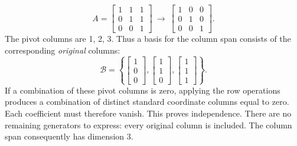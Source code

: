 \[A=\left[\begin{array}{rrr}1&1&1\\0&1&1\\0&0&1\end{array}\right]\ \longrightarrow\ \left[\begin{array}{rrr}1&0&0\\0&1&0\\0&0&1\end{array}\right].\]
The pivot columns are 1, 2, 3. Thus a basis for the column span consists of the corresponding \emph{original} columns:
\[\mathcal B=\left\{\left[\begin{array}{r}1\\0\\0\end{array}\right],\left[\begin{array}{r}1\\1\\0\end{array}\right],\left[\begin{array}{r}1\\1\\1\end{array}\right]\right\}.\]
If a combination of these pivot columns is zero, applying the row operations produces a combination of distinct standard coordinate columns equal to zero. Each coefficient must therefore vanish. This proves independence. There are no remaining generators to express: every original column is included. The column span consequently has dimension $3$.

